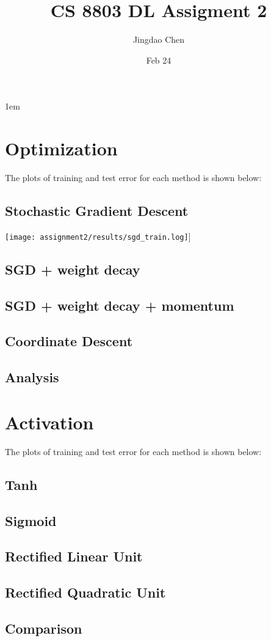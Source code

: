 \documentclass[twoside,12pt]{article}
\newcommand{\imsize}{0.5\linewidth}
\begin{document}
\title{CS 8803 DL Assigment 2}
\author{Jingdao Chen}
\date{Feb 24}
\maketitle
\openup 1em

\section{Optimization}

The plots of training and test error for each method is shown below:

\subsection{Stochastic Gradient Descent}

\texttt{[image: assignment2/results/sgd\_train.log]}]

\subsection{SGD + weight decay}
\subsection{SGD + weight decay + momentum}
\subsection{Coordinate Descent}
\subsection{Analysis}

\section{Activation}
The plots of training and test error for each method is shown below:
\subsection{Tanh}
\subsection{Sigmoid}
\subsection{Rectified Linear Unit}
\subsection{Rectified Quadratic Unit}
\subsection{Comparison}
\end{document}
